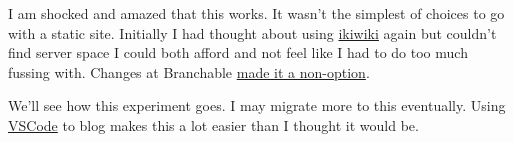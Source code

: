 I am shocked and amazed that this works. It wasn't the simplest of
choices to go with a static site. Initially I had thought about using
\href{https://en.wikipedia.org/w/index.php?title=Ikiwiki&oldid=1012497040}{ikiwiki}
again but couldn't find server space I could both afford and not feel
like I had to do too much fussing with. Changes at Branchable
\href{https://web.archive.org/web/20210815110543/http://www.branchable.com/news/changes_at_Branchable/}{made
it a non-option}.

We'll see how this experiment goes. I may migrate more to this
eventually. Using
\href{https://en.wikipedia.org/w/index.php?title=Visual_Studio_Code&oldid=1117046041}{VSCode}
to blog makes this a lot easier than I thought it would be.
